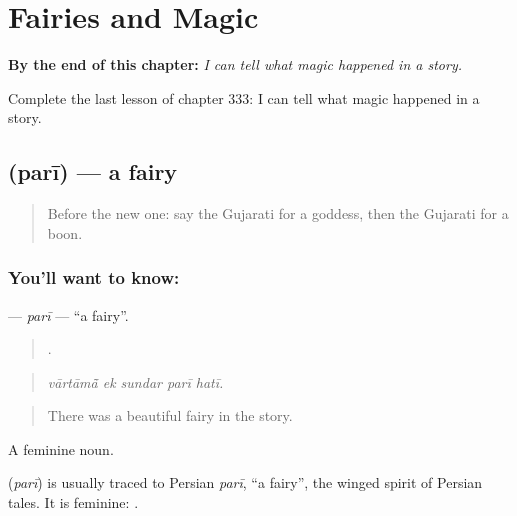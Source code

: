 
\chapter{Fairies and Magic}
\label{ch:gu-fairies-and-magic}

\begin{chapteropening}
\textbf{By the end of this chapter:} \emph{I can tell what magic happened in a story.}

Complete the last lesson of chapter 333: I can tell what magic happened in a story.
\end{chapteropening}

\section[\texorpdfstring{\gu{પરી} (parī)}{પરી (parī)}]{ (parī) — a fairy}

\label{lesson:GU-C333-pari}



\begin{quote}
Before the new one: say the Gujarati for a goddess, then the Gujarati for a boon.
\end{quote}

\subsection*{You'll want to know: }
\textbf{} — \emph{parī} — \textquotedblleft{}a fairy\textquotedblright{}.

\begin{quote}
    .
\end{quote}

\begin{quote}
\emph{vārtāmā̃ ek sundar parī hatī.}
\end{quote}

\begin{quote}
There was a beautiful fairy in the story.
\end{quote}

A feminine noun.

\begin{cousinweb}
\textbf{} (\emph{parī}) is usually traced to Persian \emph{parī}, \textquotedblleft{}a fairy\textquotedblright{}, the winged spirit of Persian tales. It is feminine: \textbf{ }.
\end{cousinweb}

